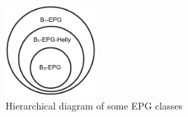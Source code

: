 \begin{figure}[htb]	
\center%
\includegraphics[width=3.5cm]{./img/diagramaClassesEPG.png}
\caption{Hierarchical diagram of some EPG classes}
\label{fig:diagramaEPG}
\end{figure}